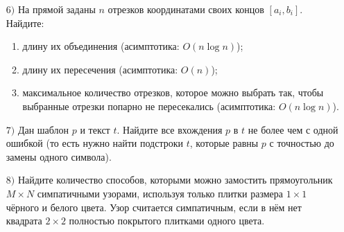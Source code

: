 \documentclass[a4paper, 12pt]{article}
\begin{document}
\begin{itemize}
  \item[$6)$] На прямой заданы $n$ отрезков координатами своих концов $[a_i, b_i]$. Найдите:
  \begin{enumerate}
    \item длину их объединения (асимптотика: $O(n \log n)$);
    \item длину их пересечения (асимптотика: $O(n)$);
    \item максимальное количество отрезков, которое можно выбрать так, чтобы выбранные отрезки попарно не пересекались (асимптотика: $O(n\log n)$).
  \end{enumerate}
  \item[$7)$] Дан шаблон $p$ и текст $t$. Найдите все вхождения $p$ в $t$ не более чем с одной ошибкой (то есть нужно найти подстроки $t$, которые равны $p$ с точностью до замены одного символа).
  \item[$8)$] Найдите количество способов, которыми можно замостить прямоугольник $M \times N$ симпатичными узорами, используя только плитки размера $1 \times 1$ чёрного и белого цвета. Узор считается симпатичным, если в нём нет квадрата $2 \times 2$ полностью покрытого плитками одного цвета.
\end{itemize}
\end{document}
